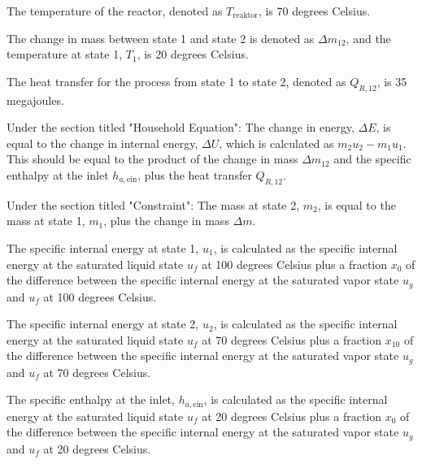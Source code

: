 The temperature of the reactor, denoted as \( T_{\text{reaktor}} \), is 70 degrees Celsius.

The change in mass between state 1 and state 2 is denoted as \( \Delta m_{12} \), and the temperature at state 1, \( T_1 \), is 20 degrees Celsius.

The heat transfer for the process from state 1 to state 2, denoted as \( Q_{R,12} \), is 35 megajoules.

Under the section titled "Household Equation":
The change in energy, \( \Delta E \), is equal to the change in internal energy, \( \Delta U \), which is calculated as \( m_2 u_2 - m_1 u_1 \). This should be equal to the product of the change in mass \( \Delta m_{12} \) and the specific enthalpy at the inlet \( h_{a, \text{ein}} \), plus the heat transfer \( Q_{R,12} \).

Under the section titled "Constraint":
The mass at state 2, \( m_2 \), is equal to the mass at state 1, \( m_1 \), plus the change in mass \( \Delta m \).

The specific internal energy at state 1, \( u_1 \), is calculated as the specific internal energy at the saturated liquid state \( u_f \) at 100 degrees Celsius plus a fraction \( x_0 \) of the difference between the specific internal energy at the saturated vapor state \( u_g \) and \( u_f \) at 100 degrees Celsius.

The specific internal energy at state 2, \( u_2 \), is calculated as the specific internal energy at the saturated liquid state \( u_f \) at 70 degrees Celsius plus a fraction \( x_{10} \) of the difference between the specific internal energy at the saturated vapor state \( u_g \) and \( u_f \) at 70 degrees Celsius.

The specific enthalpy at the inlet, \( h_{a, \text{ein}} \), is calculated as the specific internal energy at the saturated liquid state \( u_f \) at 20 degrees Celsius plus a fraction \( x_0 \) of the difference between the specific internal energy at the saturated vapor state \( u_g \) and \( u_f \) at 20 degrees Celsius.